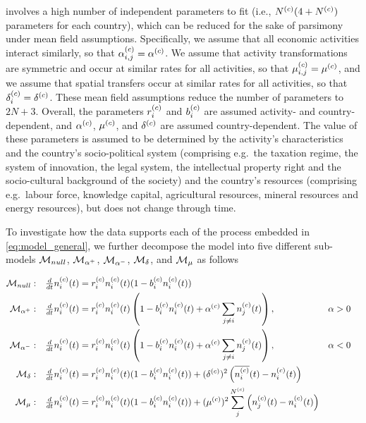  involves a high number of independent parameters to fit (i.e., $N^{(c)}(4+N^{(c)})$ parameters for each country), which can be reduced for the sake of parsimony under mean field assumptions. Specifically, we assume that all economic activities interact similarly, so that $\alpha_{i,j}^{(c)}  = \alpha^{(c)} $. We assume that activity transformations are symmetric and occur at similar rates for all activities, so that $\mu_{i,j}^{(c)}  = \mu^{(c)} $, and we assume that spatial transfers occur at similar rates for all activities, so that $\delta^{(c)} _{i} = \delta^{(c)}$. These mean field assumptions reduce the number of parameters to $2N+3$. 
% 
Overall, the parameters $r_i^{(c)}$ and $b_i^{(c)}$ are assumed activity- and country-dependent, and $\alpha^{(c)}$, $\mu^{(c)}$, and $\delta^{(c)}$ are assumed country-dependent. The value of these parameters is assumed to be determined by the activity's characteristics and the country's socio-political system (comprising e.g.~the taxation regime, the system of innovation, the legal system, the intellectual property right and the socio-cultural background of the society) and the country's resources (comprising e.g.~labour force, knowledge capital, agricultural resources, mineral resources and energy resources), but does not change through time.

To investigate how the data supports each of the process embedded in \cref{eq:model_general}, we further decompose the model into five different sub-models $\mathcal{M}_{null}$, $\mathcal{M}_{\alpha^+}$, $\mathcal{M}_{\alpha^-}$, $\mathcal{M}_\delta$, and $\mathcal{M}_\mu$ as follows

  \begin{align}
  \label{eq:submodels1}
    \mathcal{M}_{null}&:  &&\tfrac{d}{dt} n_i^{(c)}(t)  = r_i^{(c)}  n_i^{(c)}(t) (1 -  b_i^{(c)} n_i^{(c)} (t) ) \\
  \label{eq:submodels2}
    \mathcal{M}_{\alpha^+}&: && \tfrac{d}{dt} n_i^{(c)}(t)  = r_i^{(c)}  n_i^{(c)}(t) \left(1 -  b_i^{(c)} n_i^{(c)}(t) + \alpha^{(c)}  \sum_{j \neq i} n_j^{(c)}(t) \right), \quad &&\alpha > 0\\
      \label{eq:submodels3}
    \mathcal{M}_{\alpha^-}&: && \tfrac{d}{dt} n_i^{(c)}(t)  = r_i^{(c)}  n_i^{(c)}(t) \left(1 -  b_i^{(c)}  n_i^{(c)}(t) + \alpha^{(c)}  \sum_{j \neq i} n_j^{(c)}(t) \right), \quad &&\alpha < 0\\
      \label{eq:submodels4}
    \mathcal{M}_\delta&: && \tfrac{d}{dt} n_i^{(c)}(t)  = r_i^{(c)}  n_i^{(c)}(t) (1 - b_i^{(c)}  n_i^{(c)}(t) ) + (\delta^{(c)} )^2 \left(\overline{n_i^{(c)}}(t) - n_i^{(c)}(t) \right) \\
      \label{eq:submodels5}
    \mathcal{M}_{\mu}&: && \tfrac{d}{dt} n_i^{(c)}(t)  = r_i^{(c)}  n_i^{(c)}(t) (1 -  b_i^{(c)} n_i^{(c)}(t) ) + (\mu^{(c)} )^2 \sum_j^{N^{(c)}} \left( n_j^{(c)}  (t) - n_i^{(c)}(t)  \right)
  \end{align}

